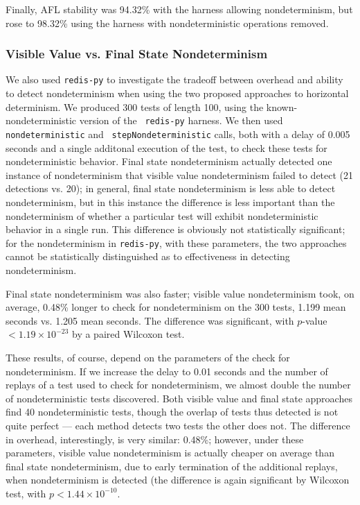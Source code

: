 Finally, AFL stability was 94.32\% with the harness allowing
nondeterminism, but rose to 98.32\% using the harness with
nondeterministic operations removed.

\subsubsection{Visible Value vs. Final State Nondeterminism}

We also used {\tt redis-py} to investigate the tradeoff between
overhead and ability to detect nondeterminism when using the two
proposed approaches to horizontal determinism.  We produced 300 tests
of length 100, using the known-nondeterministic version of the {\tt
  redis-py} harness.  We then used {\tt nondeterministic} and {\tt
  stepNondeterministic} calls, both with a delay of 0.005 seconds and
a single additonal execution of the test, to
check these tests for nondeterministic behavior.  Final state
nondeterminism actually detected one instance of nondeterminism that
visible value nondeterminism failed to detect (21 detections vs. 20); in general, final state
nondeterminism is less able to detect nondeterminism, but in this
instance the difference is less important than the nondeterminism of
whether a particular test will exhibit nondeterministic behavior in a
single run.  This difference is obviously not statistically
significant; for the nondeterminism in {\tt redis-py}, with these
parameters, the two approaches cannot be statistically distinguished
as to effectiveness in detecting nondeterminism.

Final state nondeterminism was also faster; visible value
nondeterminism took, on average, 0.48\% longer to check for
nondeterminism on the 300 tests, 1.199 mean seconds vs. 1.205 mean seconds.  The difference was significant, with
$p$-value $< 1.19 \times 10^{-23}$ by a paired Wilcoxon test.

These results, of course, depend on the parameters of the check for
nondeterminism.  If we increase the delay to 0.01 seconds and the
number of replays of a test used to check for nondeterminism, we
almost double the number of nondeterministic tests discovered.  Both
visible value and final state approaches find 40 nondeterministic
tests, though the overlap of tests thus detected is not quite perfect
--- each method detects two tests the other does not.  The difference
in overhead, interestingly, is very similar:  0.48\%; however, under
these parameters, visible value nondeterminism is actually cheaper on average
than final state nondeterminism, due to early termination of the
additional replays, when nondeterminism is detected (the difference is
again significant by Wilcoxon test, with $p < 1.44 \times 10^{-10}$.

